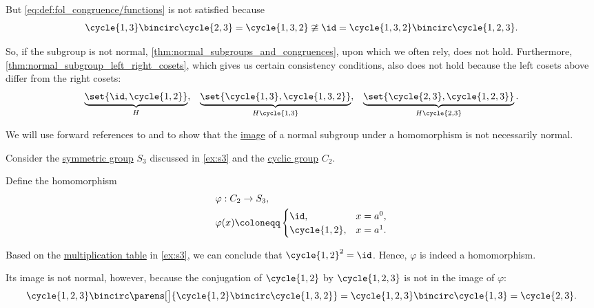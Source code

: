 \begin{example}
  But \eqref{eq:def:fol_congruence/functions} is not satisfied because
  \begin{equation*}
    \cycle{ 1, 3 } \bincirc \cycle{ 2, 3 }
    =
    \cycle{ 1, 3, 2 }
    \ncong
    \id
    =
    \cycle{ 1, 3, 2 } \bincirc \cycle{ 1, 2, 3 }.
  \end{equation*}

  So, if the subgroup is not normal, \cref{thm:normal_subgroups_and_congruences}, upon which we often rely, does not hold. Furthermore, \cref{thm:normal_subgroup_left_right_cosets}, which gives us certain consistency conditions, also does not hold because the left cosets above differ from the right cosets:
  \begin{align*}
    \underbrace{ \set{ \id, \cycle{ 1, 2 } } }_{ H },
    &&
    \underbrace{ \set{ \cycle{ 1, 3 }, \cycle{ 1, 3, 2 } } }_{ H \cycle{ 1, 3 } },
    &&
    \underbrace{ \set{ \cycle{ 2, 3 }, \cycle{ 1, 2, 3 } } }_{ H \cycle{ 2, 3 } }.
  \end{align*}
\end{example}

\begin{example}\label{ex:image_of_normal_subgroup}
  We will use forward references to  and  to show that the \hyperref[def:set_valued_function/image]{image} of a normal subgroup under a homomorphism is not necessarily normal.

  Consider the \hyperref[def:symmetric_group]{symmetric group} \( S_3 \) discussed in \cref{ex:s3} and the \hyperref[def:cyclic_group]{cyclic group} \( C_2 \).

  Define the homomorphism
  \begin{equation*}
    \begin{aligned}
      &\varphi: C_2 \to S_3, \\
      &\varphi(x) \coloneqq \begin{cases}
        \id,            &x = a^0, \\
        \cycle{ 1, 2 }, &x = a^1.
      \end{cases}
    \end{aligned}
  \end{equation*}

  Based on the \hyperref[def:cayley_table]{multiplication table} in \cref{ex:s3}, we can conclude that \( \cycle{ 1, 2 }^2 = \id \). Hence, \( \varphi \) is indeed a homomorphism.

  Its image is not normal, however, because the conjugation of \( \cycle{ 1, 2 } \) by \( \cycle{ 1, 2, 3 } \) is not in the image of \( \varphi \):
  \begin{equation*}
    \cycle{ 1, 2, 3 } \bincirc \parens[\big]{ \cycle{ 1, 2 } \bincirc \cycle{ 1, 3, 2 } }
    =
    \cycle{ 1, 2, 3 } \bincirc \cycle{ 1, 3 }
    =
    \cycle{ 2, 3 }.
  \end{equation*}
\end{example}

